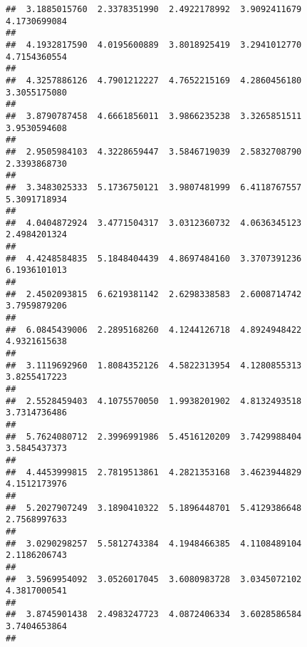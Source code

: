 \documentclass[]{article}
\begin{document}
\begin{verbatim}
##  3.1885015760  2.3378351990  2.4922178992  3.9092411679  4.1730699084 
##                                                                       
##  4.1932817590  4.0195600889  3.8018925419  3.2941012770  4.7154360554 
##                                                                       
##  4.3257886126  4.7901212227  4.7652215169  4.2860456180  3.3055175080 
##                                                                       
##  3.8790787458  4.6661856011  3.9866235238  3.3265851511  3.9530594608 
##                                                                       
##  2.9505984103  4.3228659447  3.5846719039  2.5832708790  2.3393868730 
##                                                                       
##  3.3483025333  5.1736750121  3.9807481999  6.4118767557  5.3091718934 
##                                                                       
##  4.0404872924  3.4771504317  3.0312360732  4.0636345123  2.4984201324 
##                                                                       
##  4.4248584835  5.1848404439  4.8697484160  3.3707391236  6.1936101013 
##                                                                       
##  2.4502093815  6.6219381142  2.6298338583  2.6008714742  3.7959879206 
##                                                                       
##  6.0845439006  2.2895168260  4.1244126718  4.8924948422  4.9321615638 
##                                                                       
##  3.1119692960  1.8084352126  4.5822313954  4.1280855313  3.8255417223 
##                                                                       
##  2.5528459403  4.1075570050  1.9938201902  4.8132493518  3.7314736486 
##                                                                       
##  5.7624080712  2.3996991986  5.4516120209  3.7429988404  3.5845437373 
##                                                                       
##  4.4453999815  2.7819513861  4.2821353168  3.4623944829  4.1512173976 
##                                                                       
##  5.2027907249  3.1890410322  5.1896448701  5.4129386648  2.7568997633 
##                                                                       
##  3.0290298257  5.5812743384  4.1948466385  4.1108489104  2.1186206743 
##                                                                       
##  3.5969954092  3.0526017045  3.6080983728  3.0345072102  4.3817000541 
##                                                                       
##  3.8745901438  2.4983247723  4.0872406334  3.6028586584  3.7404653864 
##                                                                       

\end{verbatim}
\end{document}
